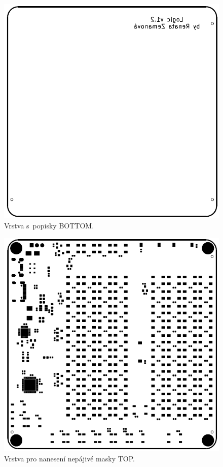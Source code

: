   \begin{figure}[!h]
    \begin{center}
      \includegraphics[scale=0.9]{prilohy/Verze2_vrstva_popisky_BOTTOM.png}
    \end{center}
    \caption[Vrstva s~popisky BOTTOM]{Vrstva s~popisky BOTTOM.}
  \end{figure}

  \begin{figure}[!h]
    \begin{center}
      \includegraphics[scale=0.9]{prilohy/Verze2_maska_TOP.png}
    \end{center}
    \caption[Vrstva pro nanesení nepájivé masky TOP]{Vrstva pro nanesení nepájivé masky TOP.}
  \end{figure}

